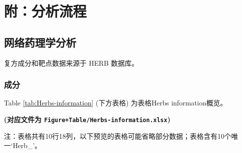 \documentclass[
]{article}
\begin{document}
\hypertarget{workflow}{%
\section{附：分析流程}\label{workflow}}

\hypertarget{ux7f51ux7edcux836fux7406ux5b66ux5206ux6790}{%
\subsection{网络药理学分析}\label{ux7f51ux7edcux836fux7406ux5b66ux5206ux6790}}

复方成分和靶点数据来源于 HERB 数据库。

\hypertarget{ux6210ux5206}{%
\subsubsection{成分}\label{ux6210ux5206}}

Table \ref{tab:Herbs-information} (下方表格) 为表格Herbs information概览。

\textbf{(对应文件为 \texttt{Figure+Table/Herbs-information.xlsx})}

\begin{center}\begin{tcolorbox}[colback=gray!10, colframe=gray!50, width=0.9\linewidth, arc=1mm, boxrule=0.5pt]注：表格共有10行18列，以下预览的表格可能省略部分数据；表格含有10个唯一`Herb\_'。
\end{tcolorbox}
\end{center}
\end{document}

